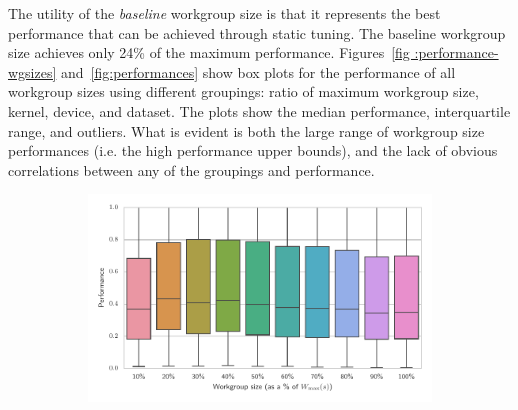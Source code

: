 \documentclass[nonatbib,preprint,nocopyrightspace,9pt]{sigplanconf}
\begin{document}
The utility of the \emph{baseline} workgroup size is that it represents the best
performance that can be achieved through static tuning. The baseline workgroup
size achieves only 24\% of the maximum performance. Figures~\ref{fig
:performance-wgsizes} and~\ref{fig:performances} show box plots for the
performance of all workgroup sizes using different groupings: ratio of maximum
workgroup size, kernel, device, and dataset. The plots show the median
performance, interquartile range, and outliers. What is evident is both the
large range of workgroup size performances (i.e. the high performance upper
bounds), and the lack of obvious correlations between any of the groupings and
performance.


\begin{figure}
  \begin{subfigure}[h]{\columnwidth}
    \centering
    \includegraphics[width=\columnwidth]{img/performance_max_wgsize}
    \vspace{-1.5em} %
    \caption{}
    \label{fig:performance-max-wgsize}
  \end{subfigure}
  \\
  \begin{subfigure}[h]{.48\columnwidth}
    \centering

\end{subfigure}
\end{figure}
\end{document}
